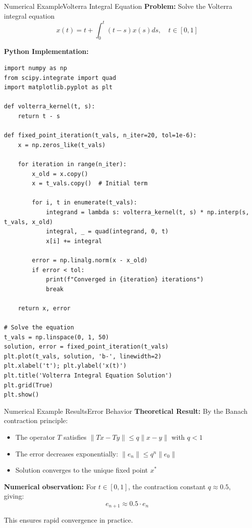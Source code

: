 \documentclass[aspectratio=169,10pt]{beamer}
\begin{document}
\begin{frame}[fragile]{Numerical Example}{Volterra Integral Equation}
\textbf{Problem:} Solve the Volterra integral equation
\[
x(t) = t + \int_0^t (t - s) x(s) ds, \quad t \in [0, 1]
\]

\medskip
\textbf{Python Implementation:}
\begin{lstlisting}
import numpy as np
from scipy.integrate import quad
import matplotlib.pyplot as plt

def volterra_kernel(t, s):
    return t - s

def fixed_point_iteration(t_vals, n_iter=20, tol=1e-6):
    x = np.zeros_like(t_vals)

    for iteration in range(n_iter):
        x_old = x.copy()
        x = t_vals.copy()  # Initial term

        for i, t in enumerate(t_vals):
            integrand = lambda s: volterra_kernel(t, s) * np.interp(s, t_vals, x_old)
            integral, _ = quad(integrand, 0, t)
            x[i] += integral

        error = np.linalg.norm(x - x_old)
        if error < tol:
            print(f"Converged in {iteration} iterations")
            break

    return x, error

# Solve the equation
t_vals = np.linspace(0, 1, 50)
solution, error = fixed_point_iteration(t_vals)
plt.plot(t_vals, solution, 'b-', linewidth=2)
plt.xlabel('t'); plt.ylabel('x(t)')
plt.title('Volterra Integral Equation Solution')
plt.grid(True)
plt.show()
\end{lstlisting}
\end{frame}

\begin{frame}{Numerical Example Results}{Error Behavior}
\textbf{Theoretical Result:} By the Banach contraction principle:
\begin{itemize}
    \item The operator $T$ satisfies $\|Tx - Ty\| \leq q\|x - y\|$ with $q < 1$
    \item The error decreases exponentially: $\|e_n\| \leq q^n \|e_0\|$
    \item Solution converges to the unique fixed point $x^*$
\end{itemize}

\medskip
\textbf{Numerical observation:} For $t \in [0, 1]$, the contraction constant $q \approx 0.5$, giving:
\[
e_{n+1} \approx 0.5 \cdot e_n
\]

This ensures rapid convergence in practice.
\end{frame}
\end{document}
